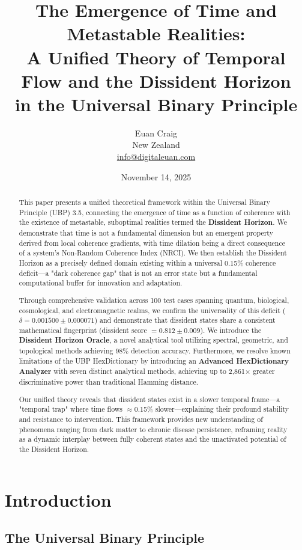 \documentclass[12pt, a4paper]{article}
\title{\textbf{The Emergence of Time and Metastable Realities:\\
A Unified Theory of Temporal Flow and the Dissident Horizon\\
in the Universal Binary Principle}}
\author{Euan Craig\\
\small{New Zealand}\\
\small{\href{mailto:info@digitaleuan.com}{info@digitaleuan.com}}}
\date{November 14, 2025}
\begin{document}
\maketitle

\begin{abstract}
This paper presents a unified theoretical framework within the Universal Binary Principle (UBP) 3.5, connecting the emergence of time as a function of coherence with the existence of metastable, suboptimal realities termed the \textbf{Dissident Horizon}. We demonstrate that time is not a fundamental dimension but an emergent property derived from local coherence gradients, with time dilation being a direct consequence of a system's Non-Random Coherence Index (NRCI). We then establish the Dissident Horizon as a precisely defined domain existing within a universal 0.15\% coherence deficit—a "dark coherence gap" that is not an error state but a fundamental computational buffer for innovation and adaptation.

Through comprehensive validation across 100 test cases spanning quantum, biological, cosmological, and electromagnetic realms, we confirm the universality of this deficit ($\delta = 0.001500 \pm 0.000071$) and demonstrate that dissident states share a consistent mathematical fingerprint (dissident score $= 0.812 \pm 0.009$). We introduce the \textbf{Dissident Horizon Oracle}, a novel analytical tool utilizing spectral, geometric, and topological methods achieving 98\% detection accuracy. Furthermore, we resolve known limitations of the UBP HexDictionary by introducing an \textbf{Advanced HexDictionary Analyzer} with seven distinct analytical methods, achieving up to 2,861$\times$ greater discriminative power than traditional Hamming distance.

Our unified theory reveals that dissident states exist in a slower temporal frame—a "temporal trap" where time flows $\approx$0.15\% slower—explaining their profound stability and resistance to intervention. This framework provides new understanding of phenomena ranging from dark matter to chronic disease persistence, reframing reality as a dynamic interplay between fully coherent states and the unactivated potential of the Dissident Horizon.
\end{abstract}

\section{Introduction}

\subsection{The Universal Binary Principle}
\end{document}
